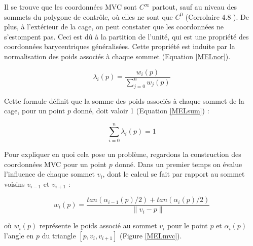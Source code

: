 Il se trouve que les coordonnées MVC sont $C^\infty$ partout, sauf au
niveau des sommets du polygone de contrôle, où elles ne sont que $C^0$
(Corrolaire 4.8 \cite{HF06}). De plus, à l'extérieur de la cage, on
peut constater que les coordonnées ne s'estompent pas. Ceci est dû à
la partition de l'unité, qui est une propriété des coordonnées
barycentriques généralisées. Cette propriété est induite par la
normalisation des poids associés à chaque sommet (Equation
\ref{MELnor}).

\begin{equation}
  \lambda_i(p) = \frac{w_i(p)}{\sum_{j=0}^n w_j(p)}
  \label{MELnor}
\end{equation}

Cette formule définit que la somme des poids associés à chaque sommet
de la cage, pour un point $p$ donné, doit valoir 1 (Equation
\ref{MELsum}) :

\begin{equation}
  \sum_{i=0}^n \lambda_i(p) = 1
  \label{MELsum}
\end{equation}

Pour expliquer en quoi cela pose un problème, regardons la
construction des coordonnées MVC pour un point $p$ donné. Dans un
premier temps on évalue l'influence de chaque sommet $v_i$, dont le
calcul se fait par rapport au sommet voisins $v_{i-1}$ et $v_{i+1}$ :

\begin{equation}
  w_i(p) = \frac{tan(\alpha_{i-1}(p)/2) + tan(\alpha_{i}(p)/2)}{\|v_i - p\|}
\end{equation}

où $w_i(p)$ représente le poids associé au sommet $v_i$ pour le point
$p$ et $\alpha_i(p)$ l'angle en $p$ du triangle $[p,v_i,v_{i+1}]$
(Figure \ref{MELmvc}).

